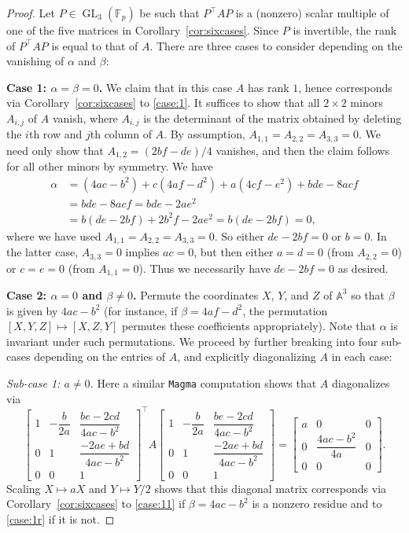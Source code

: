 \documentclass[10pt,a4paper]{amsart}
\numberwithin{equation}{section}
\numberwithin{figure}{section}
\numberwithin{table}{section}
\theoremstyle{definition}
\theoremstyle{plain}
\theoremstyle{remark}
\theoremstyle{plain}
\theoremstyle{definition}
\theoremstyle{plain}
\theoremstyle{plain}
\newcommand{\A}{\mathbb{A}}
\newcommand{\F}{\mathbb{F}}
\newcommand{\GL}{\operatorname{GL}}
\newcommand{\trsp}[1]{{{#1}^{\top}\!\!}}
\begin{document}
	\begin{proof}
		Let $P\in\GL_3(\F_p)$ be such that $\trsp{P}AP$ is a (nonzero) scalar multiple of one of the five matrices in Corollary~\ref{cor:sixcases}. Since $P$ is invertible, the rank of $\trsp{P}AP$ is equal to that of $A$. There are three cases to consider depending on the vanishing of $\alpha$ and $\beta$:

		\textbf{Case 1: $\alpha=\beta=0$.} We claim that in this case $A$ has rank $1$, hence corresponds via Corollary~\ref{cor:sixcases} to \eqref{case:1}. It suffices to show that all $2\times 2$ minors $A_{i,j}$ of $A$ vanish, where $A_{i,j}$ is the determinant of the matrix obtained by deleting the $i$th row and $j$th column of $A$. By assumption, $A_{1,1}=A_{2,2}=A_{3,3}=0$. We need only show that $A_{1,2}=(2bf-de)/4$ vanishes, and then the claim follows for all other minors by symmetry.
	We have
	\begin{align*}
	\alpha&=(4ac-b^2)+c(4af-d^2)+a(4cf-e^2)+bde-8acf\\
	&=bde-8acf = bde-2ae^2\\
	&=b(de-2bf)+2b^2f-2ae^2=b(de-2bf)=0,
	\end{align*}
	where we have used $A_{1,1}=A_{2,2}=A_{3,3}=0$. So either $de-2bf=0$ or $b=0$. In the latter case, $A_{3,3}=0$ implies $ac=0$, but then either $a=d=0$ (from $A_{2,2}=0$) or $c=e=0$ (from $A_{1,1}=0$). Thus we necessarily have $de-2bf=0$ as desired.

		\textbf{Case 2: $\alpha=0$ and $\beta\ne 0$.} Permute the coordinates $X$, $Y$, and $Z$ of $\A^3$ so that $\beta$ is given by $4ac-b^2$ (for instance, if $\beta=4af-d^2$, the permutation $[X,Y,Z]\mapsto[X,Z,Y]$ permutes these coefficients appropriately). Note that $\alpha$ is invariant under such permutations. We proceed by further breaking into four sub-cases depending on the entries of $A$, and explicitly diagonalizing $A$ in each case:

\emph{Sub-case 1: $a\ne 0$.} Here a similar \texttt{Magma} computation shows that $A$ diagonalizes via
		\begin{equation*}
		\begin{bmatrix}
		1 & -\dfrac{b}{2a} & \dfrac{be - 2cd}{4ac - b^2}\\
		0 & 1 & \dfrac{-2ae + bd}{4ac - b^2} \\
		0 & 0 & 1
		\end{bmatrix}^\top\!
		A
		\begin{bmatrix}
		1 & -\dfrac{b}{2a} & \dfrac{be - 2cd}{4ac - b^2}\\
		0 & 1 & \dfrac{-2ae + bd}{4ac - b^2} \\
		0 & 0 & 1
		\end{bmatrix}
		=
		\begin{bmatrix}
		a&0&0\\
		0&\dfrac{4ac-b^2}{4a}&0\\
		0&0&0
		\end{bmatrix}.
		\end{equation*}
		Scaling $X\mapsto aX$ and $Y\mapsto Y/2$ shows that this diagonal matrix corresponds via Corollary~\ref{cor:sixcases} to \eqref{case:11} if $\beta=4ac-b^2$ is a nonzero residue and to \eqref{case:1r} if it is not.


\end{proof}
\end{document}
